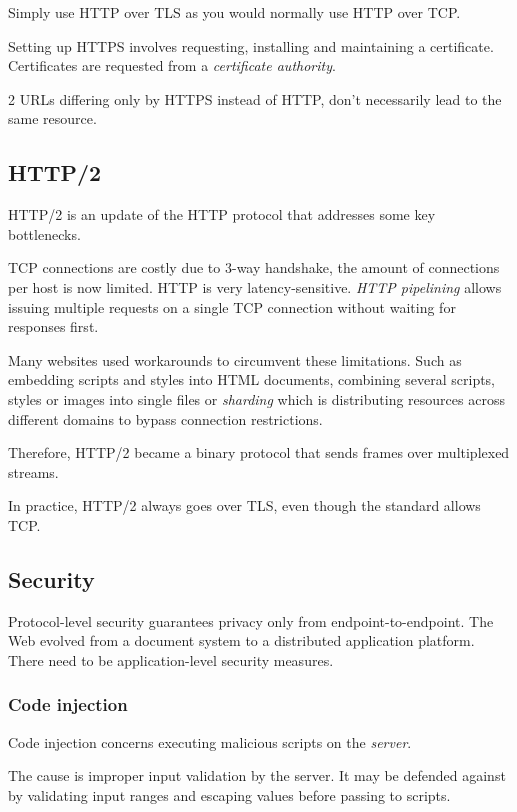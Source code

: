 \documentclass{report}
\begin{document}
Simply use HTTP over TLS
as you would normally use HTTP over TCP.

Setting up HTTPS involves requesting,
installing and maintaining a certificate.
Certificates are requested from a \textit{certificate authority}.

2 URLs differing only by HTTPS instead of HTTP,
don't necessarily lead to the same resource.

\subsection{HTTP/2}

HTTP/2 is an update of the HTTP protocol
that addresses some key bottlenecks.

TCP connections are costly due to 3-way handshake,
the amount of connections per host is now limited.
HTTP is very latency-sensitive.
\textit{HTTP pipelining} allows issuing multiple requests
on a single TCP connection without waiting for responses first.

Many websites used workarounds to circumvent these limitations.
Such as embedding scripts and styles into HTML documents,
combining several scripts, styles or images into single files
or \textit{sharding} which is distributing resources
across different domains to bypass connection restrictions.

Therefore, HTTP/2 became a binary protocol
that sends frames over multiplexed streams.

In practice, HTTP/2 always goes over TLS,
even though the standard allows TCP.

\subsection{Security}

Protocol-level security guarantees privacy
only from endpoint-to-endpoint.
The Web evolved from a document system
to a distributed application platform.
There need to be application-level security measures.

\subsubsection{Code injection}

Code injection concerns executing
malicious scripts on the \emph{server}.

The cause is improper input validation by the server.
It may be defended against by validating input ranges
and escaping values before passing to scripts.
\end{document}
